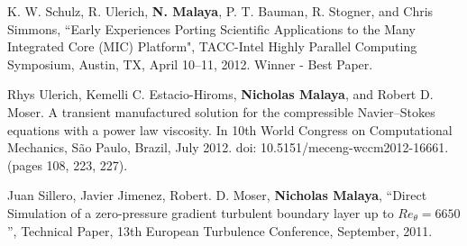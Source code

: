 K. W. Schulz,  R. Ulerich,  \textbf{N. Malaya}, P. T. Bauman, R. Stogner, and Chris Simmons,
``Early Experiences Porting Scientific Applications to the Many Integrated Core (MIC) Platform",
TACC-Intel Highly Parallel Computing Symposium, Austin, TX,
April 10--11, 2012. Winner - Best Paper.

\blankline

Rhys Ulerich, Kemelli C. Estacio-Hiroms, \textbf{Nicholas Malaya}, and Robert D. Moser.
A transient manufactured solution for the compressible Navier–Stokes equations
with a power law viscosity. In 10th World Congress on Computational Mechanics,
São Paulo, Brazil, July 2012. doi: 10.5151/meceng-wccm2012-16661. (pages
108, 223, 227).

\blankline

Juan Sillero, Javier Jimenez, Robert. D. Moser, \textbf{Nicholas Malaya},
``Direct Simulation of a zero-pressure gradient turbulent boundary layer
up to $Re_{\theta}=6650$'', Technical Paper, 13th European Turbulence
Conference, September, 2011.
